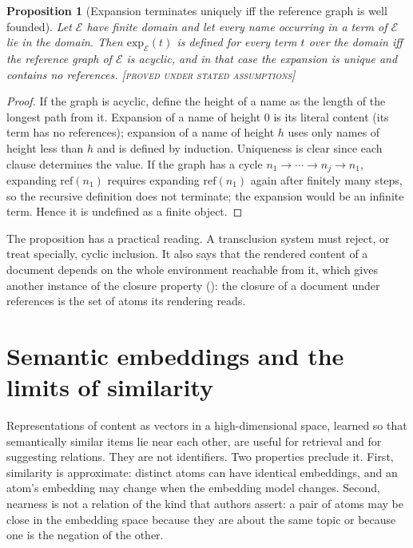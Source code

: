 \documentclass[11pt,twoside,openright]{book}
\theoremstyle{plain}
\newtheorem{proposition}[theorem]{Proposition}
\theoremstyle{definition}
\theoremstyle{remark}
\newcommand{\Proved}{\textup{\textsc{[proved under stated assumptions]}}}
\begin{document}
\begin{proposition}[Expansion terminates uniquely iff the reference graph is well founded]\label{prop:expansion}
Let $\mathcal{E}$ have finite domain and let every name occurring in a term of $\mathcal{E}$ lie in the domain. Then $\mathrm{exp}_\mathcal{E}(t)$ is defined for every term $t$ over the domain iff the reference graph of $\mathcal{E}$ is acyclic, and in that case the expansion is unique and contains no references.
\Proved{}
\end{proposition}

\begin{proof}
If the graph is acyclic, define the height of a name as the length of the longest path from it. Expansion of a name of height $0$ is its literal content (its term has no references); expansion of a name of height $h$ uses only names of height less than $h$ and is defined by induction. Uniqueness is clear since each clause determines the value. If the graph has a cycle $n_1\to\cdots\to n_j\to n_1$, expanding $\mathrm{ref}(n_1)$ requires expanding $\mathrm{ref}(n_1)$ again after finitely many steps, so the recursive definition does not terminate; the expansion would be an infinite term. Hence it is undefined as a finite object.
\end{proof}

The proposition has a practical reading. A transclusion system must reject, or treat specially, cyclic inclusion. It also says that the rendered content of a document depends on the whole environment reachable from it, which gives another instance of the closure property (): the closure of a document under references is the set of atoms its rendering reads.

\section{Semantic embeddings and the limits of similarity}

Representations of content as vectors in a high-dimensional space, learned so that semantically similar items lie near each other, are useful for retrieval and for suggesting relations. They are not identifiers. Two properties preclude it. First, similarity is approximate: distinct atoms can have identical embeddings, and an atom's embedding may change when the embedding model changes. Second, nearness is not a relation of the kind that authors assert: a pair of atoms may be close in the embedding space because they are about the same topic or because one is the negation of the other.
\end{document}

